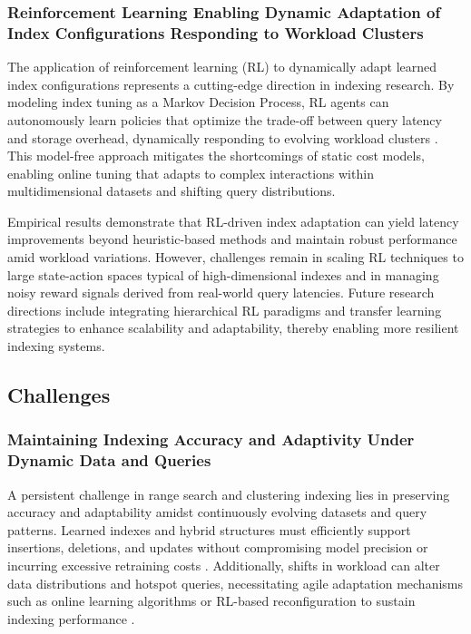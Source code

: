 \documentclass[sigconf]{acmart}
\begin{document}
\subsubsection{Reinforcement Learning Enabling Dynamic Adaptation of Index Configurations Responding to Workload Clusters}

The application of reinforcement learning (RL) to dynamically adapt learned index configurations represents a cutting-edge direction in indexing research. By modeling index tuning as a Markov Decision Process, RL agents can autonomously learn policies that optimize the trade-off between query latency and storage overhead, dynamically responding to evolving workload clusters \cite{ref33}. This model-free approach mitigates the shortcomings of static cost models, enabling online tuning that adapts to complex interactions within multidimensional datasets and shifting query distributions.

Empirical results demonstrate that RL-driven index adaptation can yield latency improvements beyond heuristic-based methods and maintain robust performance amid workload variations. However, challenges remain in scaling RL techniques to large state-action spaces typical of high-dimensional indexes and in managing noisy reward signals derived from real-world query latencies. Future research directions include integrating hierarchical RL paradigms and transfer learning strategies to enhance scalability and adaptability, thereby enabling more resilient indexing systems.

\subsection{Challenges}

\subsubsection{Maintaining Indexing Accuracy and Adaptivity Under Dynamic Data and Queries}

A persistent challenge in range search and clustering indexing lies in preserving accuracy and adaptability amidst continuously evolving datasets and query patterns. Learned indexes and hybrid structures must efficiently support insertions, deletions, and updates without compromising model precision or incurring excessive retraining costs \cite{ref34}. Additionally, shifts in workload can alter data distributions and hotspot queries, necessitating agile adaptation mechanisms such as online learning algorithms or RL-based reconfiguration to sustain indexing performance \cite{ref33}.
\end{document}
